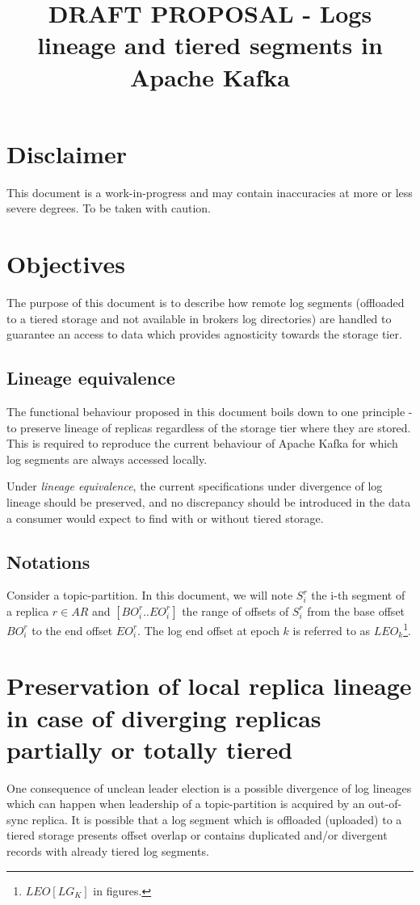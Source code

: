 \documentclass{article}
\title{DRAFT PROPOSAL - Logs lineage and tiered segments in Apache Kafka}
\begin{document}
\section{Disclaimer}
This document is a work-in-progress and may contain inaccuracies at more or less severe degrees. To be taken with caution.

\section{Objectives}
The purpose of this document is to describe how remote log segments (offloaded to a tiered storage and not available in brokers log directories) are handled to guarantee an access to data which provides agnosticity towards the storage tier.

\subsection{Lineage equivalence}

The functional behaviour proposed in this document boils down to one principle - to preserve lineage of replicas regardless of the storage tier where they are stored. This is required to reproduce the current behaviour of Apache Kafka for which log segments are always accessed locally.

Under \textit{lineage equivalence}, the current specifications under divergence of log lineage should be preserved, and no discrepancy should be introduced in the data a consumer would expect to find with or without tiered storage.

\subsection{Notations}
Consider a topic-partition. In this document, we will note $S_i^r$ the i-th segment of a replica $r \in AR$ and $[BO_i^r..EO_i^r]$ the range of offsets of $S_i^r$ from the base offset $BO_i^r$ to the end offset $EO_i^r$. The log end offset at epoch $k$ is referred to as $LEO_k$\footnote{$LEO[LG_K]$ in figures.}.

\section{Preservation of local replica lineage in case of diverging replicas partially or totally tiered}

One consequence of unclean leader election is a possible divergence of log lineages which can happen when leadership of a topic-partition is acquired by an out-of-sync replica. It is possible that a log segment which is offloaded (uploaded) to a tiered storage presents offset overlap or contains duplicated and/or divergent records with already tiered log segments.
\end{document}
